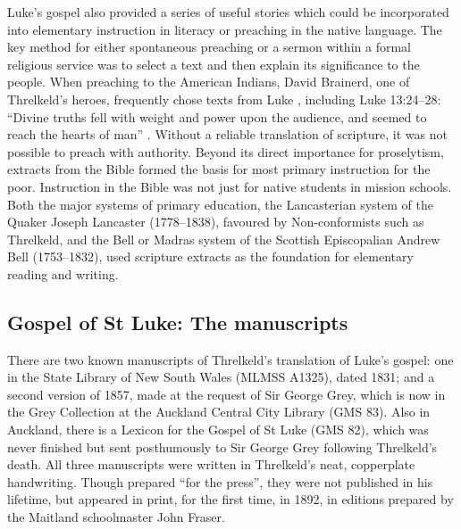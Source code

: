 {Luke’s gospel also provided a series of useful stories which could be incorporated into elementary instruction in literacy or preaching in the native language. The key method for either spontaneous preaching or a sermon within a formal religious service was to select a text and then explain its significance to the people. When preaching to the American Indians, David Brainerd, one of Threlkeld’s heroes, frequently chose texts from Luke \citep[300, 317, 328, 330]{edwards_life_1826}, including Luke 13:24--28: “Divine truths fell with weight and power upon the audience, and seemed to reach the hearts of man” \citep[330]{edwards_life_1826}. Without a reliable translation of scripture, it was not possible to preach with authority. Beyond its direct importance for proselytism, extracts from the Bible formed the basis for most primary instruction for the poor. Instruction in the Bible was not just for native students in mission schools. Both the major systems of primary education, the Lancasterian system of the Quaker Joseph Lancaster (1778--1838), favoured by Non-conformists such as Threlkeld, and the Bell or Madras system of the Scottish Episcopalian Andrew Bell (1753--1832), used scripture extracts as the foundation for elementary reading and writing.

\subsection{Gospel of St Luke: The manuscripts}

There are two known manuscripts of Threlkeld’s translation of Luke’s gospel: one in the State Library of New South Wales (MLMSS A1325), dated 1831; and a second version of 1857, made at the request of Sir George Grey, which is now in the Grey Collection at the Auckland Central City Library (GMS 83). Also in Auckland, there is a Lexicon for the Gospel of St Luke (GMS 82), which was never finished but sent posthumously to Sir George Grey following Threlkeld’s death. All three manuscripts were written in Threlkeld’s neat, copperplate handwriting. Though prepared “for the press”, they were not published in his lifetime, but appeared in print, for the first time, in 1892, in editions prepared by the Maitland schoolmaster John Fraser.

}
